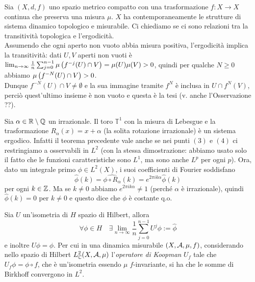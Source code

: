 \begin{oss}Sia $(X,d,f)$ uno spazio metrico compatto con una trasformazione $f:X\to X$ continua che preserva
una misura $\mu$. $X$ ha contemporaneamente le strutture di sistema dinamico topologico
e misurabile. Ci chiediamo se ci sono relazioni tra la transitività topologica e l'ergodicità. \\
Assumendo che ogni aperto non vuoto abbia misura positiva, l'ergodicità implica la transitività:
dati $U,V$ aperti non vuoti è $\lim_{n\to\infty}\frac{1}{n}\sum_{j=0}^{n-1}\mu\left(f^{-j}(U)\cap V\right)=\mu(U)\mu(V)>0$,
quindi per qualche $N\ge 0$ abbiamo $\mu\left(f^{-N}(U)\cap V\right)>0$. \\
Dunque $f^{-N}(U)\cap V\neq\emptyset$ e la sua immagine tramite $f^N$ è inclusa in $U\cap f^N(V)$, perciò
quest'ultimo insieme è non vuoto e questa è la tesi (v. anche l'Osservazione ??).
\end{oss}

\begin{esempio}Sia $\alpha\in\mathbb{R}\setminus\mathbb{Q}$ un irrazionale. Il toro $\mathbb{T}^1$
con la misura di Lebesgue e la trasformazione $R_\alpha(x)=x+\alpha$ (la solita rotazione irrazionale)
è un sistema ergodico. Infatti il teorema precedente vale anche se nei punti $(3)$ e $(4)$ ci restringiamo a osservabili in $L^2$
(con la stessa dimostrazione: abbiamo usato solo il fatto che le funzioni caratteristiche sono $L^1$, ma
sono anche $L^p$ per ogni $p$). Ora, dato un integrale primo $\phi\in L^2(X)$, i suoi coefficienti di Fourier soddisfano
\[ \widehat{\phi}(k)=\widehat{\phi\circ R_\alpha}(k)=e^{2\pi i k\alpha}\widehat{\phi}(k) \]
per ogni $k\in\mathbb{Z}$. Ma se $k\neq 0$ abbiamo $e^{2\pi i k\alpha}\neq 1$ (perché $\alpha$ è irrazionale), quindi
$\widehat{\phi}(k)=0$ per $k\neq 0$ e questo dice che $\phi$ è costante q.o.
\end{esempio}


\begin{teo} Sia $U$ un'isometria di $H$ spazio di Hilbert, allora
 \[\forall\phi\in H \quad \exists \lim_{n\rightarrow\infty}\frac{1}{n}\sum_{j=0}^{n-1}U^j\phi:=\hat\phi\]
 e inoltre $U\hat\phi=\phi$. Per cui in una dinamica misurabile $(X,\mathcal{A},\mu,f)$, considerando nello spazio di Hilbert $L^2_{\mathbb{C}}(X,\mathcal{A},\mu)$ l'\emph{operatore di Koopman} $U_f$ tale che $U_f \phi=\phi\circ f$, che è un'isometria essendo $\mu$ $f$-invariante, si ha che le somme di Birkhoff convergono in $L^2$. 
 \end{teo}

